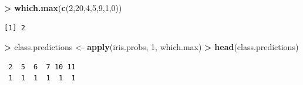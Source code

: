 \documentclass[
]{krantz}
\makeatletter
\newenvironment{Shaded}{\begin{snugshade}}{\end{snugshade}}
\newcommand{\DecValTok}[1]{\textcolor[rgb]{0.06,0.06,0.06}{#1}}
\newcommand{\KeywordTok}[1]{\textcolor[rgb]{0.27,0.27,0.27}{\textbf{#1}}}
\newcommand{\NormalTok}[1]{#1}
\newcommand{\OperatorTok}[1]{\textcolor[rgb]{0.43,0.43,0.43}{\textbf{#1}}}
\newcommand{\StringTok}[1]{\textcolor[rgb]{0.5,0.5,0.5}{#1}}
\newenvironment{kframe}{%
\medskip{}
\setlength{\fboxsep}{.8em}
 \def\at@end@of@kframe{}%
 \ifinner\ifhmode%
  \def\at@end@of@kframe{\end{minipage}}%
  \begin{minipage}{\columnwidth}%
 \fi\fi%
 \def\FrameCommand##1{\hskip\@totalleftmargin \hskip-\fboxsep
 \colorbox{shadecolor}{##1}\hskip-\fboxsep
     \hskip-\linewidth \hskip-\@totalleftmargin \hskip\columnwidth}%
 \MakeFramed {\advance\hsize-\width
   \@totalleftmargin\z@ \linewidth\hsize
   \@setminipage}}%
 {\par\unskip\endMakeFramed%
 \at@end@of@kframe}
\renewenvironment{Shaded}{\begin{kframe}}{\end{kframe}}
\makeatother
\begin{document}
\begin{Shaded}
\begin{Highlighting}[]
\OperatorTok{\textgreater{}}\StringTok{ }\KeywordTok{which.max}\NormalTok{(}\KeywordTok{c}\NormalTok{(}\DecValTok{2}\NormalTok{,}\DecValTok{20}\NormalTok{,}\DecValTok{4}\NormalTok{,}\DecValTok{5}\NormalTok{,}\DecValTok{9}\NormalTok{,}\DecValTok{1}\NormalTok{,}\DecValTok{0}\NormalTok{))}
\end{Highlighting}
\end{Shaded}

\begin{verbatim}
[1] 2
\end{verbatim}

\begin{Shaded}
\begin{Highlighting}[]
\OperatorTok{\textgreater{}}\StringTok{ }\NormalTok{class.predictions \textless{}{-}}\StringTok{ }\KeywordTok{apply}\NormalTok{(iris.probs, }\DecValTok{1}\NormalTok{, which.max)}
\OperatorTok{\textgreater{}}\StringTok{ }\KeywordTok{head}\NormalTok{(class.predictions)}
\end{Highlighting}
\end{Shaded}

\begin{verbatim}
 2  5  6  7 10 11 
 1  1  1  1  1  1 
\end{verbatim}

\begin{Shaded}
\end{Shaded}
\end{document}
